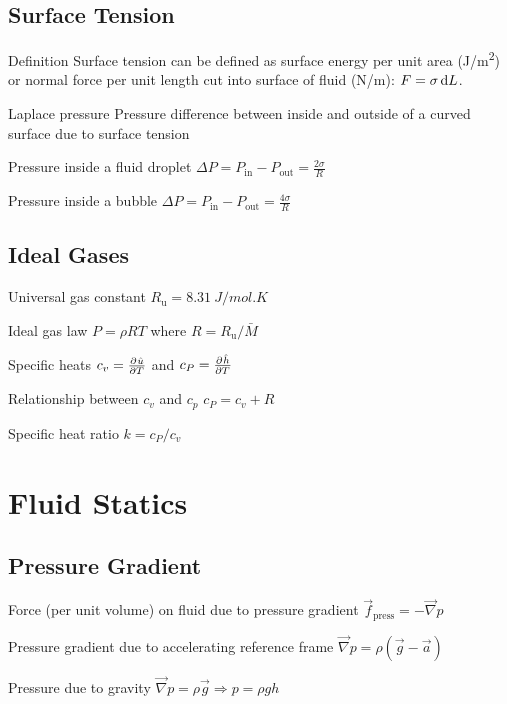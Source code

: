 \documentclass{article}
\begin{document}
\subsection{Surface Tension}
\begin{description*}
\item[Definition] Surface tension can be defined as surface energy per unit area (\si{J/m^2}) or
  normal force per unit length cut into surface of fluid (\si{N/m}): \(F = \sigma \dif L\).
\item[Laplace pressure] Pressure difference between inside and outside of a curved surface due to
  surface tension
  \begin{description*}
  \item[Pressure inside a fluid droplet]
    \(\Delta P = P_\mathrm{in} -
    P_\mathrm{out} = \frac{2\sigma}{R}\)
  \item[Pressure inside a bubble] \(\Delta P = P_\mathrm{in} -
    P_\mathrm{out} = \frac{4\sigma}{R}\)
  \end{description*}
\end{description*}

\subsection{Ideal Gases}
\begin{description*}
\item[Universal gas constant]
  \(R_\mathrm{u} = \SI{8.31}{J/mol.K}\)
\item[Ideal gas law]
  \(P = \rho R T\) where \(R = R_\mathrm{u}/\bar{M}\)
\item[Specific heats]
  \(c_v = \pd{\hat u}{T}\) and \(c_P = \pd{\hat h}{T}\)
\item[Relationship between $c_v$ and $c_p$]
  \(c_P = c_v + R\)
\item[Specific heat ratio]
  \(k = c_P/c_v\)
\end{description*}

\section{Fluid Statics}

\subsection{Pressure Gradient}
\begin{description*}
\item[Force (per unit volume) on fluid due to pressure gradient]
  \(\vec{f}_\mathrm{press} = -\vec\nabla p\)
\item[Pressure gradient due to accelerating reference frame]
  \(\vec\nabla p = \rho \left(\vec{g}-\vec{a}\right)\)
\item[Pressure due to gravity]
  \(\vec\nabla p = \rho \vec g \Rightarrow p = \rho g h\)
\end{description*}
\end{document}
